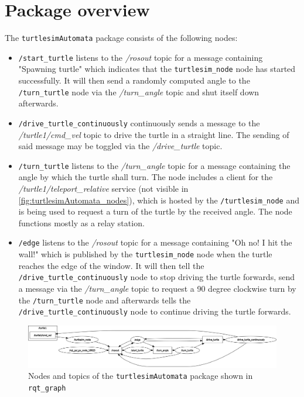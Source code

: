 \chapter{Package overview}
\label{chapter:package_overview}
The \texttt{turtlesimAutomata} package consists of the following nodes:

\begin{itemize}
    \item \texttt{/start\_turtle} listens to the \emph{/rosout} topic for a message containing "Spawning turtle" which indicates that the \texttt{turtlesim\_node} node has started successfully. It will then send a randomly computed angle to the \texttt{/turn\_turtle} node via the \emph{/turn\_angle} topic and shut itself down afterwards.
    \item \texttt{/drive\_turtle\_continuously} continuously sends a message to the \emph{/turtle1/cmd\_vel} topic to drive the turtle in a straight line. The sending of said message may be toggled via the \emph{/drive\_turtle} topic.
    \item \texttt{/turn\_turtle} listens to the \emph{/turn\_angle} topic for a message containing the angle by which the turtle shall turn. The node includes a client for the \emph{/turtle1/teleport\_relative} service (not visible in \autoref{fig:turtlesimAutomata_nodes}), which is hosted by the \texttt{/turtlesim\_node} and is being used to request a turn of the turtle by the received angle. The node functions mostly as a relay station.
    \item \texttt{/edge} listens to the \emph{/rosout} topic for a message containing "Oh no! I hit the wall!" which is published by the \texttt{turtlesim\_node} node when the turtle reaches the edge of the window. It will then tell the \texttt{/drive\_turtle\_continuously} node to stop driving the turtle forwards, send a message via the \emph{/turn\_angle} topic to request a 90 degree clockwise turn by the \texttt{/turn\_turtle} node and afterwards tells the \texttt{/drive\_turtle\_continuously} node to continue driving the turtle forwards.
\end{itemize}


\begin{figure}[htbp]
    \centering
    \includegraphics[width=1\textwidth]{./img/rosgraph.png}
    \caption{Nodes and topics of the \texttt{turtlesimAutomata} package shown in \texttt{rqt\_graph}}
    \label{fig:turtlesimAutomata_nodes}
\end{figure}



